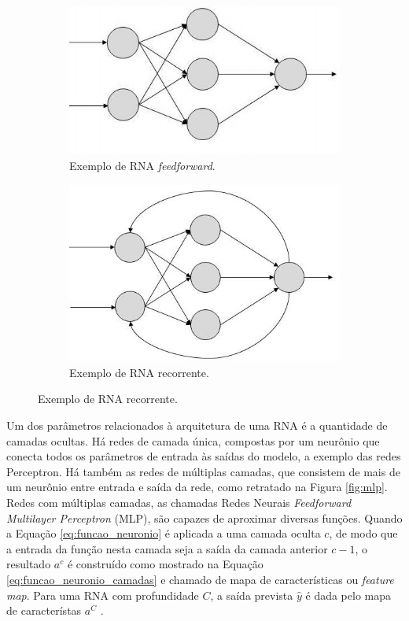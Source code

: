 \begin{figure}[h!]
	\caption{Exemplos de RNA com diferentes tipos de conexões entre neurônios \cite{rna:feedback}.}
	\label{fig:rna_conectividade}
	\begin{subfigure}[h]{0.35\linewidth}
		\caption{Exemplo de RNA \emph{feedforward}.}
		\label{fig:feedforward}
		\includegraphics[width=\linewidth]{img/feedforward.jpg}
	\end{subfigure}
	\hfill
	\begin{subfigure}[h]{0.35\linewidth}
		\caption{Exemplo de RNA recorrente.}
		\label{fig:recorrente}
		\includegraphics[width=\linewidth]{img/recorrente2}
	\end{subfigure}%
\end{figure}

Um dos parâmetros relacionados à arquitetura de uma RNA é a quantidade de camadas ocultas. Há redes de camada única, compostas por um neurônio que conecta todos os parâmetros de entrada às saídas do modelo, a exemplo das redes Perceptron. Há também as redes de múltiplas camadas, que consistem de mais de um neurônio entre entrada e saída da rede, como retratado na Figura \ref{fig:mlp}. Redes com múltiplas camadas, as chamadas Redes Neurais \emph{Feedforward Multilayer Perceptron} (MLP), são capazes de aproximar diversas funções. Quando a Equação \ref{eq:funcao_neuronio} é aplicada a uma camada oculta $c$, de modo que a entrada da função nesta camada seja a saída da camada anterior $c-1$, o resultado $a^{c}$ é construído como mostrado na Equação \ref{eq:funcao_neuronio_camadas} e chamado de mapa de características ou \emph{feature map}. Para uma RNA com profundidade $C$, a saída prevista $\hat{y}$
é dada pelo mapa de característas $a^C$ \cite{hornik1991approximation,Teresa:Livro}.


